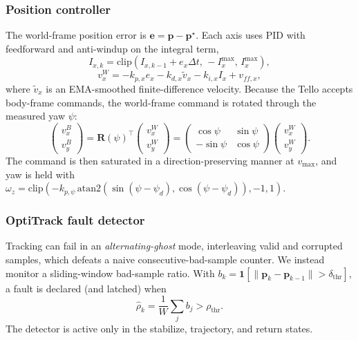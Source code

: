 \documentclass[conference]{IEEEtran}
\newcommand{\Rmat}{\mathbf{R}}
\begin{document}
\subsubsection{Position controller}
The world-frame position error is $\mathbf{e}=\mathbf{p}-\mathbf{p}^\star$. Each
axis uses PID with feedforward and anti-windup on the integral term,
\begin{equation}
I_{x,k}=\mathrm{clip}\!\left(I_{x,k-1}+e_x\Delta t,\,-I_x^{\max},\,I_x^{\max}\right),
\end{equation}
\begin{equation}
v_x^W=-k_{p,x}e_x-k_{d,x}\tilde{v}_x-k_{i,x}I_x+v_{ff,x},
\end{equation}
where $\tilde{v}_x$ is an EMA-smoothed finite-difference velocity. Because the
Tello accepts body-frame commands, the world-frame command is rotated through
the measured yaw $\psi$:
\begin{equation}
\begin{pmatrix}v_x^B\\v_y^B\end{pmatrix}
=\Rmat(\psi)^\top\begin{pmatrix}v_x^W\\v_y^W\end{pmatrix}
=\begin{pmatrix}\cos\psi&\sin\psi\\-\sin\psi&\cos\psi\end{pmatrix}
\begin{pmatrix}v_x^W\\v_y^W\end{pmatrix}.
\end{equation}
The command is then saturated in a direction-preserving manner at $v_{\max}$, and
yaw is held with $\omega_z=\mathrm{clip}\!\left(-k_{p,\psi}\,\mathrm{atan2}
(\sin(\psi-\psi_d),\cos(\psi-\psi_d)),-1,1\right)$.

\subsubsection{OptiTrack fault detector}
Tracking can fail in an \emph{alternating-ghost} mode, interleaving valid and
corrupted samples, which defeats a naive consecutive-bad-sample counter. We
instead monitor a sliding-window bad-sample ratio. With
$b_k=\mathbf{1}\!\left[\lVert\mathbf{p}_k-\mathbf{p}_{k-1}\rVert>\delta_\text{thr}\right]$,
a fault is declared (and latched) when
\begin{equation}
\hat\rho_k=\frac{1}{W}\sum_{j} b_j > \rho_\text{thr}.
\end{equation}
The detector is active only in the stabilize, trajectory, and return states.
\end{document}
